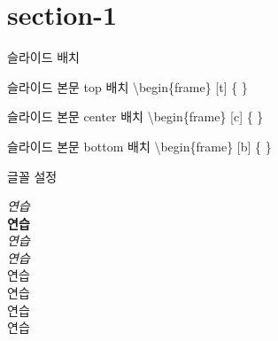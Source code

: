 \documentclass[10pt,blue,xcolor=pdftex,dvipsnames,table,handout]{beamer}
\begin{document}
		\section{section-1}
		\begin{frame}[t]{슬라이드 배치}

			\begin{block} {슬라이드 본문 top 배치}
			\textbackslash begin\{frame\} [t] \{ \}
			\end{block}

			\begin{block} {슬라이드 본문 center 배치}
			\textbackslash begin\{frame\} [c] \{ \}
			\end{block}

			\begin{block} {슬라이드 본문 bottom 배치}
			\textbackslash begin\{frame\} [b] \{ \}
			\end{block}

		\end{frame}



		\begin{frame}[t]{글꼴 설정}

			\emph{연습} \\
			\textbf{연습} \\
			\textit{연습} \\
			\textsl{연습} \\

			\alert{연습}\\ 
			\textrm{연습}\\ 
			\textsf{연습}\\ 
			\color{green}연습 \\


		\end{frame}
\end{document}
